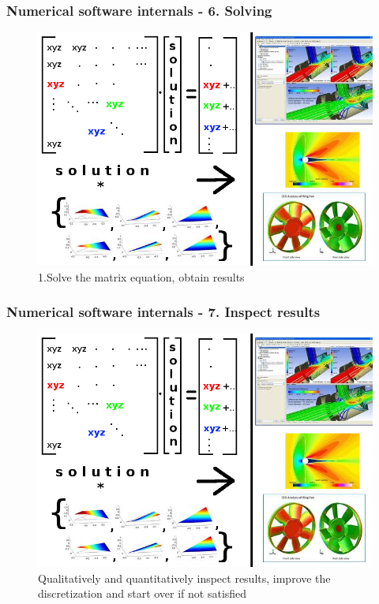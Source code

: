 \documentclass{beamer}
\begin{document}
\begin{frame}
\large
\frametitle{Numerical software internals - 6. Solving}
\begin{figure}[!ht]
\vspace{-1mm}
\begin{center}
\includegraphics[height=0.8\textheight]{internals6.png}
\caption{1.Solve the matrix equation, obtain results}
\end{center}
\noindent
\vspace{-4mm}
\end{figure}
\end{frame}
\begin{frame}
\large
\frametitle{Numerical software internals - 7. Inspect results}
\begin{figure}[!ht]
\vspace{-1mm}
\begin{center}
\includegraphics[height=0.8\textheight]{internals6.png}
\caption{Qualitatively and quantitatively inspect results, improve the discretization and start over if not satisfied}
\end{center}
\noindent
\vspace{-4mm}
\end{figure}
\end{frame}
\end{document}
